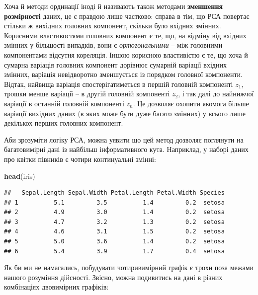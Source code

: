 \documentclass[
  11pt,
]{book}
\newenvironment{Shaded}{\begin{snugshade}}{\end{snugshade}}
\newcommand{\FunctionTok}[1]{\textcolor[rgb]{0.13,0.29,0.53}{\textbf{#1}}}
\newcommand{\NormalTok}[1]{#1}
\begin{document}
Хоча й методи ординації іноді й називають також методами \textbf{зменшення розмірності} даних, це є правдою лише частково: справа в тім, що РСА повертає стільки ж вихідних головних компонент, скільки було вхідних змінних. Корисними властивостями головних компонент є те, що, на відміну від вхідних змінних у більшості випадків, вони є \emph{ортогональними} -- між головними компонентами відсутня кореляція. Іншою корисною властивістю є те, що хоча й сумарна варіація головних компонент дорівнює сумарній варіації вхідних змінних, варіація невідворотно зменшується із порядком головної компоненти. Відтак, найвища варіація спостерігатиметься в першій головній компоненті \(z_1\), трошки менше варіації -- в другій головній компоненті \(z_2\), і так далі до найнижчої варіації в останній головній компоненті \(z_n\). Це дозволяє охопити якомога більше варіації вихідних даних (в яких може бути дуже багато змінних) у всього лише декількох перших головних компонент.

Аби зрозуміти логіку РСА, можна уявити що цей метод дозволяє поглянути на багатовимірні дані із найбільш інформативного кута. Наприклад, у наборі даних про квітки півників є чотири континуальні змінні:

\begin{Shaded}
\begin{Highlighting}[]
\FunctionTok{head}\NormalTok{(iris)}
\end{Highlighting}
\end{Shaded}

\begin{verbatim}
##   Sepal.Length Sepal.Width Petal.Length Petal.Width Species
## 1          5.1         3.5          1.4         0.2  setosa
## 2          4.9         3.0          1.4         0.2  setosa
## 3          4.7         3.2          1.3         0.2  setosa
## 4          4.6         3.1          1.5         0.2  setosa
## 5          5.0         3.6          1.4         0.2  setosa
## 6          5.4         3.9          1.7         0.4  setosa
\end{verbatim}

Як би ми не намагались, побудувати чотиривимірний графік є трохи поза межами нашого розуміння дійсності. Звісно, можна подивитись на дані в різних комбінаціях двовимірних графіків:
\end{document}
